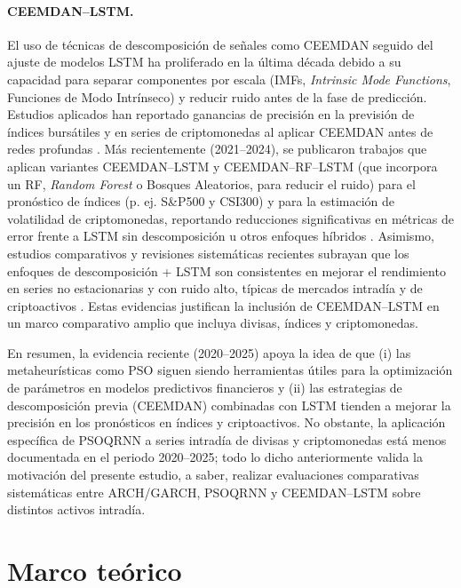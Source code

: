 \documentclass[12pt]{paper}
\begin{document}
\paragraph{CEEMDAN--LSTM.}
El uso de técnicas de descomposición de señales como CEEMDAN seguido del ajuste de modelos LSTM ha proliferado en la última década debido a su capacidad para separar componentes por escala (IMFs, \textit{Intrinsic Mode Functions}, Funciones de Modo Intrínseco) y reducir ruido antes de la fase de predicción. Estudios aplicados han reportado ganancias de precisión en la previsión de índices bursátiles y en series de criptomonedas al aplicar CEEMDAN antes de redes profundas \citep{lin2021ceemdanlstm, cao2019financial}. Más recientemente (2021–2024), se publicaron trabajos que aplican variantes CEEMDAN–LSTM y CEEMDAN–RF–LSTM (que incorpora un RF, \textit{Random Forest} o Bosques Aleatorios, para reducir el ruido) para el pronóstico de índices (p. ej. S\&P500 y CSI300) y para la estimación de volatilidad de criptomonedas, reportando reducciones significativas en métricas de error frente a LSTM sin descomposición u otros enfoques híbridos \citep{lin2021ceemdanlstm, wang2024ceemdanrf_lstm}. Asimismo, estudios comparativos y revisiones sistemáticas recientes subrayan que los enfoques de descomposición + LSTM son consistentes en mejorar el rendimiento en series no estacionarias y con ruido alto, típicas de mercados intradía y de criptoactivos \citep{aksehir2024review, zhu2024ceemdan_lstm_bn}. Estas evidencias justifican la inclusión de CEEMDAN--LSTM en un marco comparativo amplio que incluya divisas, índices y criptomonedas.


En resumen, la evidencia reciente (2020--2025) apoya la idea de que (i) las metaheurísticas como PSO siguen siendo herramientas útiles para la optimización de parámetros en modelos predictivos financieros y (ii) las estrategias de descomposición previa (CEEMDAN) combinadas con LSTM tienden a mejorar la precisión en los pronósticos en índices y criptoactivos. No obstante, la aplicación específica de PSOQRNN a series intradía de divisas y criptomonedas está menos documentada en el periodo 2020--2025; todo lo dicho anteriormente valida la motivación del presente estudio, a saber, realizar evaluaciones comparativas sistemáticas entre ARCH/GARCH, PSOQRNN y CEEMDAN--LSTM sobre distintos activos intradía.


\section[Marco teórico]{Marco teórico}
\end{document}
